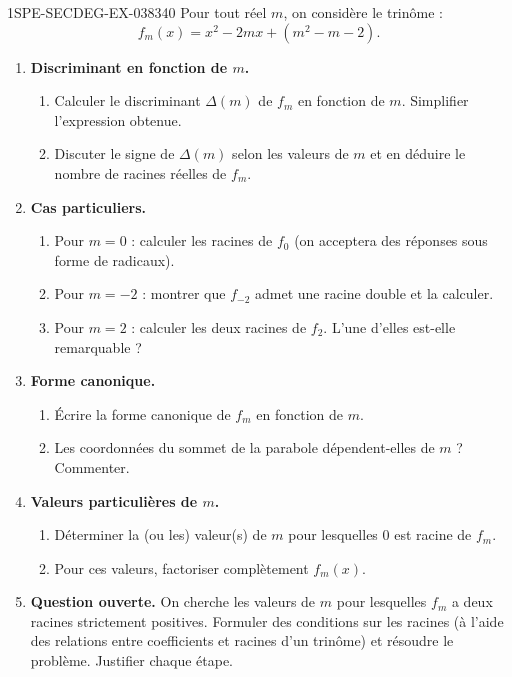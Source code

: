 \begin{exercice}{1SPE-SECDEG-EX-038}{3}{40}
Pour tout réel $m$, on considère le trinôme :
\[
  f_m(x) = x^2 - 2mx + (m^2 - m - 2).
\]

\begin{enumerate}
  \item \textbf{Discriminant en fonction de $m$.}
  \begin{enumerate}
    \item Calculer le discriminant $\Delta(m)$ de $f_m$ en fonction de $m$. Simplifier l'expression obtenue.
    \item Discuter le signe de $\Delta(m)$ selon les valeurs de $m$ et en déduire le nombre de racines réelles de $f_m$.
  \end{enumerate}

  \item \textbf{Cas particuliers.}
  \begin{enumerate}
    \item Pour $m = 0$ : calculer les racines de $f_0$ (on acceptera des réponses sous forme de radicaux).
    \item Pour $m = -2$ : montrer que $f_{-2}$ admet une racine double et la calculer.
    \item Pour $m = 2$ : calculer les deux racines de $f_2$. L'une d'elles est-elle remarquable ?
  \end{enumerate}

  \item \textbf{Forme canonique.}
  \begin{enumerate}
    \item Écrire la forme canonique de $f_m$ en fonction de $m$.
    \item Les coordonnées du sommet de la parabole dépendent-elles de $m$ ? Commenter.
  \end{enumerate}

  \item \textbf{Valeurs particulières de $m$.}
  \begin{enumerate}
    \item Déterminer la (ou les) valeur(s) de $m$ pour lesquelles $0$ est racine de $f_m$.
    \item Pour ces valeurs, factoriser complètement $f_m(x)$.
  \end{enumerate}

  \item \textbf{Question ouverte.} On cherche les valeurs de $m$ pour lesquelles $f_m$ a deux racines strictement positives. Formuler des conditions sur les racines (à l'aide des relations entre coefficients et racines d'un trinôme) et résoudre le problème. Justifier chaque étape.
\end{enumerate}
\end{exercice}
